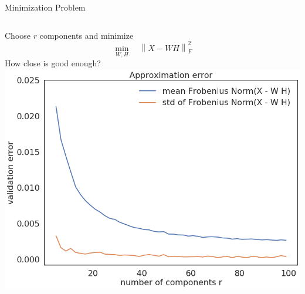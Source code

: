 \documentclass[aspectratio=169]{beamer}
\begin{document}
\begin{frame}{Minimization Problem}

	\begin{columns}
			Choose $r$ components and minimize 
			\begin{equation*}
			 \min_{ W, H }  \quad \left\lVert X - W H\right\rVert^2_F
			\end{equation*}
			How close is good enough?
			\includegraphics[width=\linewidth]{images/error_per_component.png}
	\end{columns}
\end{frame}

\end{document}
